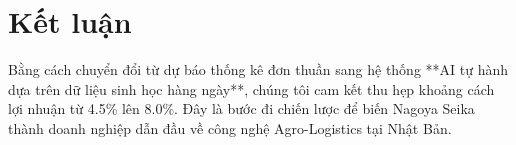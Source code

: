 \documentclass[12pt, a4paper]{article}
\begin{document}
\section{Kết luận}
Bằng cách chuyển đổi từ dự báo thống kê đơn thuần sang hệ thống **AI tự hành dựa trên dữ liệu sinh học hàng ngày**, chúng tôi cam kết thu hẹp khoảng cách lợi nhuận từ 4.5\% lên 8.0\%. Đây là bước đi chiến lược để biến Nagoya Seika thành doanh nghiệp dẫn đầu về công nghệ Agro-Logistics tại Nhật Bản.
\end{document}

